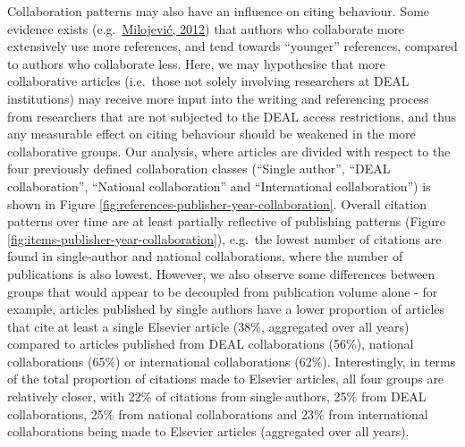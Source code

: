 \documentclass[
]{article}
\begin{document}
Collaboration patterns may also have an influence on citing behaviour. Some evidence exists (e.g.~\href{https://doi.org/10.1371/journal.pone.0049176}{Milojević, 2012}) that authors who collaborate more extensively use more references, and tend towards ``younger'' references, compared to authors who collaborate less. Here, we may hypothesise that more collaborative articles (i.e.~those not solely involving researchers at DEAL institutions) may receive more input into the writing and referencing process from researchers that are not subjected to the DEAL access restrictions, and thus any measurable effect on citing behaviour should be weakened in the more collaborative groups. Our analysis, where articles are divided with respect to the four previously defined collaboration classes (``Single author'', ``DEAL collaboration'', ``National collaboration'' and ``International collaboration'') is shown in Figure \ref{fig:references-publisher-year-collaboration}. Overall citation patterns over time are at least partially reflective of publishing patterns (Figure \ref{fig:items-publisher-year-collaboration}), e.g.~the lowest number of citations are found in single-author and national collaborations, where the number of publications is also lowest. However, we also observe some differences between groups that would appear to be decoupled from publication volume alone - for example, articles published by single authors have a lower proportion of articles that cite at least a single Elsevier article (38\%, aggregated over all years) compared to articles published from DEAL collaborations (56\%), national collaborations (65\%) or international collaborations (62\%). Interestingly, in terms of the total proportion of citations made to Elsevier articles, all four groups are relatively closer, with 22\% of citations from single authors, 25\% from DEAL collaborations, 25\% from national collaborations and 23\% from international collaborations being made to Elsevier articles (aggregated over all years).
\end{document}
